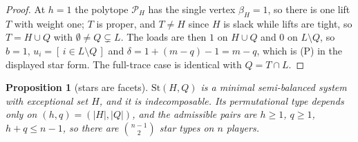 \documentclass[11pt]{article}
\newtheorem{proposition}[theorem]{Proposition}
\begin{document}
\begin{proof}
At $h=1$ the polytope $\mathcal P_H$ has the single vertex $\beta_H=1$, so
there is one lift $T$ with weight one; $T$ is proper, and $T\ne H$ since $H$
is slack while lifts are tight, so $T=H\cup Q$ with
$\emptyset\ne Q\subsetneq L$.  The loads are then $1$ on $H\cup Q$ and $0$
on $L\setminus Q$, so $b=1$, $u_i=[\,i\in L\setminus Q\,]$ and
$\delta=1+(m-q)-1=m-q$, which is (P) in the displayed star form.  The
full-trace case is identical with $Q=T\cap L$.
\end{proof}

\begin{proposition}[stars are facets]\label{sel:prop:starfacet}
$\mathrm{St}(H,Q)$ is a minimal semi-balanced system with exceptional set $H$,
and it is indecomposable.  Its permutational type depends only on
$(h,q)=(|H|,|Q|)$, and the admissible pairs are $h\ge1$, $q\ge1$,
$h+q\le n-1$, so there are $\binom{n-1}{2}$ star types on $n$ players.
\end{proposition}
\end{document}
